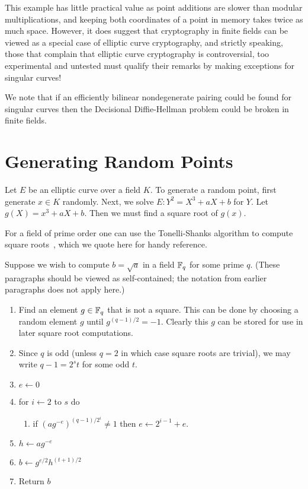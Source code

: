 This example has little practical value as point additions are slower than
modular multiplications, and keeping both coordinates of a point in memory
takes twice as much space. However, it does suggest
that cryptography in finite fields can be viewed as a special
case of elliptic curve cryptography, and strictly speaking,
those that complain that elliptic curve cryptography is controversial,
too experimental and untested must qualify
their remarks by making exceptions for singular curves!

We note that if an efficiently bilinear nondegenerate pairing could be found
for singular curves then the Decisional Diffie-Hellman problem could be broken
in finite fields.

\section {Generating Random Points}

Let $E$ be an elliptic curve over a field $K$.
To generate a random point, first generate $x \in K$ randomly.
Next, we solve $E : Y^2 = X^3 + a X + b$ for $Y$.
Let $g(X) = x^3 + a X + b$. Then
we must find a square root of $g(x)$.

For a field of prime order one can use the Tonelli-Shanks algorithm
to compute square roots~\cite{bss, handbook},
which we quote here for handy reference.

Suppose we wish to compute $b = \sqrt{a}$ in
a field $\mathbb{F}_q$ for some prime $q$. (These paragraphs should be viewed
as self-contained; the notation from earlier paragraphs does not apply here.)

\begin{enumerate}
\item
Find an element $g \in \mathbb{F}_q$ that is not a square. This can be done
by choosing a random element $g$ until $g^{(q-1)/2} = -1$. 
Clearly this $g$ can be stored for use in later square root computations.
\item
Since $q$ is odd (unless $q = 2$ in which case square roots are trivial),
we may write $q - 1 = 2^s t$ for some odd $t$.
\item
$e \leftarrow 0$
\item
for $i \leftarrow 2$ to $s$ do
\begin{enumerate}
\item
if $(ag^{-e})^{(q-1)/2^i} \ne 1$ then $e \leftarrow 2^{i-1} + e$.
\end{enumerate}
\item
$h \leftarrow ag^{-e}$
\item
$b \leftarrow g^{e/2} h^{(t+1)/2}$
\item
Return $b$
\end{enumerate}

